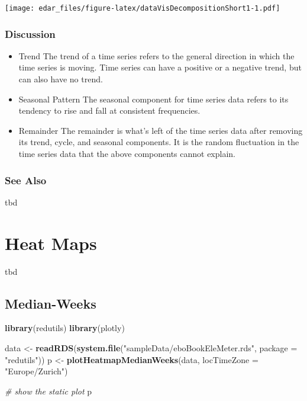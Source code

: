\documentclass[
]{book}
\newenvironment{Shaded}{\begin{snugshade}}{\end{snugshade}}
\newcommand{\CommentTok}[1]{\textcolor[rgb]{0.56,0.35,0.01}{\textit{#1}}}
\newcommand{\DataTypeTok}[1]{\textcolor[rgb]{0.13,0.29,0.53}{#1}}
\newcommand{\KeywordTok}[1]{\textcolor[rgb]{0.13,0.29,0.53}{\textbf{#1}}}
\newcommand{\NormalTok}[1]{#1}
\newcommand{\StringTok}[1]{\textcolor[rgb]{0.31,0.60,0.02}{#1}}
\let\oldShaded\Shaded
\let\endoldShaded\endShaded
\renewenvironment{Shaded}{\footnotesize\oldShaded}{\endoldShaded}
\begin{document}
\texttt{[image: edar\_files/figure-latex/dataVisDecompositionShort1-1.pdf]}

\hypertarget{discussion-5}{%
\subsection{Discussion}\label{discussion-5}}

\begin{itemize}
\item
  Trend
  The trend of a time series refers to the general direction in which the time series is moving. Time series can have a positive or a negative trend, but can also have no trend.
\item
  Seasonal Pattern
  The seasonal component for time series data refers to its tendency to rise and fall at consistent frequencies.
\item
  Remainder
  The remainder is what's left of the time series data after removing its trend, cycle, and seasonal components. It is the random fluctuation in the time series data that the above components cannot explain.
\end{itemize}

\hypertarget{see-also-1}{%
\subsection{See Also}\label{see-also-1}}

tbd

\hypertarget{heat-maps}{%
\chapter{Heat Maps}\label{heat-maps}}

tbd

\hypertarget{median-weeks}{%
\section{Median-Weeks}\label{median-weeks}}

\begin{Shaded}
\begin{Highlighting}[]
\KeywordTok{library}\NormalTok{(redutils)}
\KeywordTok{library}\NormalTok{(plotly)}

\NormalTok{data <-}\StringTok{ }\KeywordTok{readRDS}\NormalTok{(}\KeywordTok{system.file}\NormalTok{(}\StringTok{"sampleData/eboBookEleMeter.rds"}\NormalTok{, }\DataTypeTok{package =} \StringTok{"redutils"}\NormalTok{))}
\NormalTok{p <-}\StringTok{ }\KeywordTok{plotHeatmapMedianWeeks}\NormalTok{(data, }\DataTypeTok{locTimeZone =} \StringTok{"Europe/Zurich"}\NormalTok{)}

\CommentTok{# show the static plot}
\NormalTok{p}
\end{Highlighting}
\end{Shaded}
\end{document}
